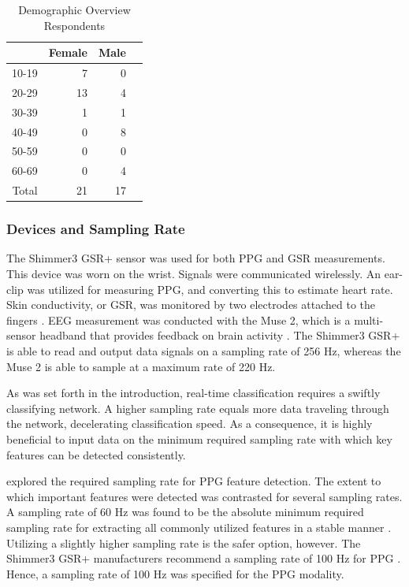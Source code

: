 \documentclass[12pt]{article}
\begin{document}
\bgroup
\def\arraystretch{1.6}  
\begin{table}[h]
\bigskip
\caption{Demographic Overview Respondents}
\label{table:demographics}
\begin{tabular}{rrrr}
  \hline
 & Female & Male \\ 
  \hline
10-19 &   7 &   0 &  \hspace{1cm} \\ 
  20-29 &  13 &   4 &   \\ 
  30-39 &   1 &   1  &   \\ 
  40-49 &   0 &   8  &   \\ 
  50-59 &   0 &   0 &   \\ 
  60-69 &   0 &   4 &   \\ \hline
  Total    &  21 &  17 & \\ \hline
\end{tabular}
\end{table}
\egroup

\subsubsection{Devices and Sampling Rate}
The Shimmer3 GSR+ sensor was used for both PPG and GSR measurements. This device was worn on the wrist. Signals were communicated wirelessly. An ear-clip was utilized for measuring PPG, and converting this to estimate heart rate. Skin conductivity, or GSR, was monitored by two electrodes attached to the fingers \cite{shimmer}. EEG measurement was conducted with the Muse 2, which is a multi-sensor headband that provides feedback on brain activity \cite{muse}. The Shimmer3 GSR+ is able to read and output data signals on a sampling rate of 256 Hz, whereas the Muse 2 is able to sample at a maximum rate of 220 Hz. 

As was set forth in the introduction, real-time classification requires a swiftly classifying network. A higher sampling rate equals more data traveling through the network, decelerating classification speed. As a consequence, it is highly beneficial to input data on the minimum required sampling rate with which key features can be detected consistently.

 explored the required sampling rate for PPG feature detection. The extent to which important features were detected was contrasted for several sampling rates. A sampling rate of 60 Hz was found to be the absolute minimum required sampling rate for extracting all commonly utilized features in a stable manner \cite{fujita2019evaluation}. Utilizing a slightly higher sampling rate is the safer option, however. The Shimmer3 GSR+ manufacturers recommend a sampling rate of 100 Hz for PPG \cite{shimmer}. Hence, a sampling rate of 100 Hz was specified for the PPG modality. 
\end{document}
